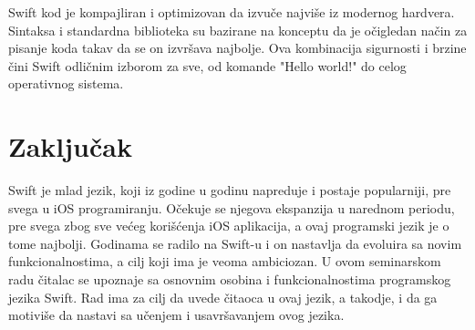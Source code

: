 \documentclass[a4paper]{article}
\begin{document}
Swift kod je kompajliran i optimizovan da izvuče najviše iz modernog hardvera. Sintaksa i standardna biblioteka su bazirane na konceptu da je očigledan način za pisanje koda takav da se on izvršava najbolje. Ova kombinacija sigurnosti i brzine čini Swift odličnim izborom za sve, od komande "Hello world!" do celog operativnog sistema.

\section{Zaključak}
\label{sec:zakljucak}
Swift je mlad jezik, koji iz godine u godinu napreduje i postaje popularniji, pre svega u iOS programiranju. Očekuje se njegova ekspanzija u narednom periodu, pre svega zbog sve većeg korišćenja iOS aplikacija, a ovaj programski jezik je o tome najbolji. Godinama se radilo na Swift-u i on nastavlja da evoluira sa novim funkcionalnostima, a cilj koji ima je veoma ambiciozan. U ovom seminarskom radu čitalac se upoznaje sa osnovnim osobina i funkcionalnostima programskog jezika Swift. Rad ima za cilj da uvede čitaoca u ovaj jezik, a takodje, i da ga motiviše da nastavi sa učenjem i usavršavanjem ovog jezika. 


\appendix
 
\end{document}
